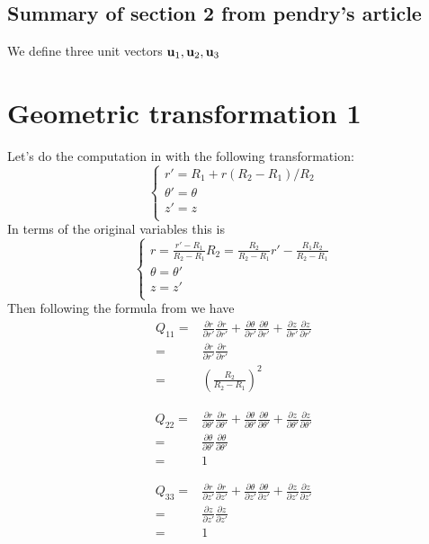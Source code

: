 \documentclass{amsart}
\begin{document}
\subsection{Summary of section 2 from pendry's article}
We define three unit vectors $\textbf{u}_1,\textbf{u}_2,\textbf{u}_3$
\section{Geometric transformation 1}
Let's do the computation in \cite{ward96} with the following transformation:
\[\begin{cases}
r'=R_1+r(R_2-R_1)/R_2\\
\theta'=\theta\\
z'=z\\
\end{cases}\]
In terms of the original variables this is
\[\begin{cases}
r=\frac{r'-R_1}{R_2-R_1}R_2=\frac{R_2}{R_2-R_1}r'-\frac{R_1R_2}{R_2-R_1}\\
\theta=\theta'\\
z=z'\\
\end{cases}\]
Then following the formula from \cite{ward96} we have
\begin{align*}
Q_{11}
=&\frac{\partial r}{\partial r'}\frac{\partial r}{\partial r'}
+\frac{\partial \theta}{\partial r'}\frac{\partial \theta}{\partial r'}
+\frac{\partial z}{\partial r'}\frac{\partial z}{\partial r'}\\
=&\frac{\partial r}{\partial r'}\frac{\partial r}{\partial r'}\\
=&\left(\frac{R_2}{R_2-R_1}\right)^2
\end{align*}

\begin{align*}
Q_{22}
=&\frac{\partial r}{\partial \theta'}\frac{\partial r}{\partial \theta'}
+\frac{\partial \theta}{\partial \theta'}\frac{\partial \theta}{\partial \theta'}
+\frac{\partial z}{\partial \theta'}\frac{\partial z}{\partial \theta'}\\
=&\frac{\partial \theta}{\partial \theta'}\frac{\partial \theta}{\partial \theta'}\\
=&1
\end{align*}

\begin{align*}
Q_{33}
=&\frac{\partial r}{\partial z'}\frac{\partial r}{\partial z'}
+\frac{\partial \theta}{\partial z'}\frac{\partial \theta}{\partial z'}
+\frac{\partial z}{\partial z'}\frac{\partial z}{\partial z'}\\
=&\frac{\partial z}{\partial z'}\frac{\partial z}{\partial z'}\\
=&1
\end{align*}
\end{document}
